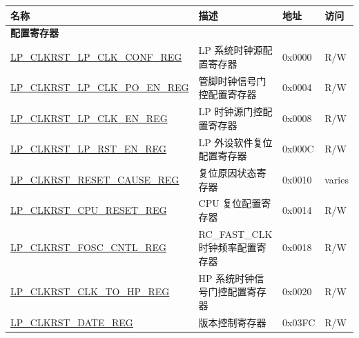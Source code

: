 \begin{longtable}{ | p{6cm} | p{7.2cm} | p{1.3cm} | p{1cm} | }
\hline\rowcolor{lightgray}
\textbf{名称} & \textbf{描述} &  \textbf{地址} & \textbf{访问} \\ \hline
\endhead
\multicolumn{4}{|l|}{\textbf{配置寄存器}} \\ \hline
\hyperref[regdesc:LPCLKRSTLPCLKCONFREG]{LP\_CLKRST\_LP\_CLK\_CONF\_REG} & LP 系统时钟源配置寄存器 & 0x0000 & R/W \\ \hline
\hyperref[regdesc:LPCLKRSTLPCLKPOENREG]{LP\_CLKRST\_LP\_CLK\_PO\_EN\_REG} & 管脚时钟信号门控配置寄存器 & 0x0004 & R/W \\ \hline
\hyperref[regdesc:LPCLKRSTLPCLKENREG]{LP\_CLKRST\_LP\_CLK\_EN\_REG} & LP 时钟源门控配置寄存器 & 0x0008 & R/W \\ \hline
\hyperref[regdesc:LPCLKRSTLPRSTENREG]{LP\_CLKRST\_LP\_RST\_EN\_REG} & LP 外设软件复位配置寄存器 & 0x000C & R/W \\ \hline
\hyperref[regdesc:LPCLKRSTRESETCAUSEREG]{LP\_CLKRST\_RESET\_CAUSE\_REG} & 复位原因状态寄存器 & 0x0010 & varies \\ \hline
\hyperref[regdesc:LPCLKRSTCPURESETREG]{LP\_CLKRST\_CPU\_RESET\_REG} & CPU 复位配置寄存器 & 0x0014 & R/W \\ \hline
\hyperref[regdesc:LPCLKRSTFOSCCNTLREG]{LP\_CLKRST\_FOSC\_CNTL\_REG} & RC\_FAST\_CLK 时钟频率配置寄存器 & 0x0018 & R/W \\ \hline
\hyperref[regdesc:LPCLKRSTCLKTOHPREG]{LP\_CLKRST\_CLK\_TO\_HP\_REG} & HP 系统时钟信号门控配置寄存器 & 0x0020 & R/W \\ \hline
\hyperref[regdesc:LPCLKRSTDATEREG]{LP\_CLKRST\_DATE\_REG} & 版本控制寄存器 & 0x03FC & R/W \\ \hline
\end{longtable}

